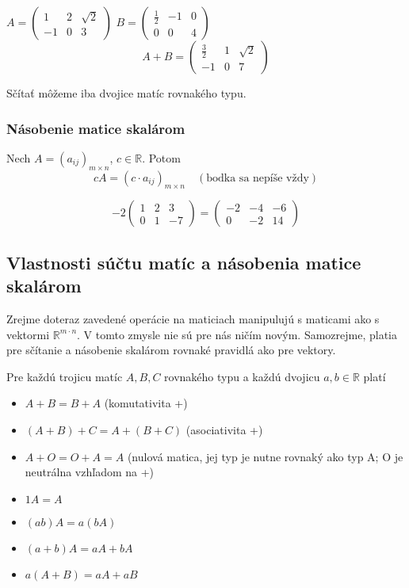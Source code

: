 \begin{example}
$A = \begin{pmatrix} 1 & 2 & \sqrt{2} \\ -1 & 0 & 3 \end{pmatrix}$ $B = \begin{pmatrix} \frac{1}{2} & -1 & 0 \\ 0 & 0 & 4 \end{pmatrix}$
\[ A + B = \begin{pmatrix} \frac{3}{2} & 1 & \sqrt{2} \\ -1 & 0 & 7 \end{pmatrix} \]
\end{example}
Sčítať môžeme iba dvojice matíc rovnakého typu.

\subsubsection{Násobenie matice skalárom}
Nech $A = (a_{ij})_{m \times n}$, $c \in \mathbb{R}$. Potom
\[ c A = (c \cdot a_{ij})_{m \times n} \quad (\text{bodka sa nepíše vždy}) \]
\begin{example}
\[ -2 \begin{pmatrix} 1 & 2 & 3 \\ 0 & 1 & -7 \end{pmatrix} = \begin{pmatrix} -2 & -4 & -6 \\ 0 & -2 & 14 \end{pmatrix} \]
\end{example}

\subsection{Vlastnosti súčtu matíc a násobenia matice skalárom}
Zrejme doteraz zavedené operácie na maticiach manipulujú s maticami ako s vektormi $\mathbb{R}^{m \cdot n}$. V tomto zmysle nie sú pre nás ničím novým.
Samozrejme, platia pre sčítanie a násobenie skalárom rovnaké pravidlá ako pre vektory.

Pre každú trojicu matíc $A, B, C$ rovnakého typu a každú dvojicu $a, b \in \mathbb{R}$ platí
\begin{itemize}
    \item $A + B = B + A$ (komutativita +)
    \item $(A + B) + C = A + (B + C)$ (asociativita +)
    \item $A + O = O + A = A$ \quad (nulová matica, jej typ je nutne rovnaký ako typ A; O je neutrálna vzhľadom na +)
    \item $1A = A$
    \item $(ab)A = a(bA)$
    \item $(a+b)A = aA + bA$
    \item $a(A+B) = aA + aB$
\end{itemize}

